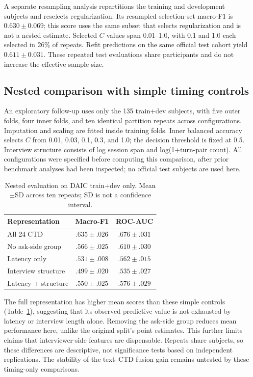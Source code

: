 \documentclass{article}
\begin{document}
A separate resampling analysis repartitions the training and development subjects and reselects regularization. Its resampled selection-set macro-F1 is $0.630\pm0.069$; this score uses the same subset that selects regularization and is not a nested estimate. Selected $C$ values span 0.01--1.0, with 0.1 and 1.0 each selected in 26\% of repeats. Refit predictions on the same official test cohort yield $0.611\pm0.031$. These repeated test evaluations share participants and do not increase the effective sample size.

\subsection{Nested comparison with simple timing controls}
An exploratory follow-up uses only the 135 train+dev subjects, with five outer folds, four inner folds, and ten identical partition repeats across configurations. Imputation and scaling are fitted inside training folds. Inner balanced accuracy selects $C$ from 0.01, 0.03, 0.1, 0.3, and 1.0; the decision threshold is fixed at 0.5. Interview structure consists of log session span and log(1+turn-pair count). All configurations were specified before computing this comparison, after prior benchmark analyses had been inspected; no official test subjects are used here.

\begin{table}[t]
\centering
\caption{Nested evaluation on DAIC train+dev only. Mean$\pm$SD across ten repeats; SD is not a confidence interval.}
\label{tab:controls}
\small
\begin{tabular}{lcc}
\toprule
Representation & Macro-F1 & ROC-AUC\\
\midrule
All 24 CTD & $.635\pm.026$ & $.676\pm.031$\\
No ask-side group & $.566\pm.025$ & $.610\pm.030$\\
Latency only & $.531\pm.008$ & $.562\pm.015$\\
Interview structure & $.499\pm.020$ & $.535\pm.027$\\
Latency + structure & $.550\pm.025$ & $.576\pm.029$\\
\bottomrule
\end{tabular}
\end{table}

The full representation has higher mean scores than these simple controls (Table~\ref{tab:controls}), suggesting that its observed predictive value is not exhausted by latency or interview length alone. Removing the ask-side group reduces mean performance here, unlike the original split's point estimates. This further limits claims that interviewer-side features are dispensable. Repeats share subjects, so these differences are descriptive, not significance tests based on independent replications. The stability of the text--CTD fusion gain remains untested by these timing-only comparisons.
\end{document}
